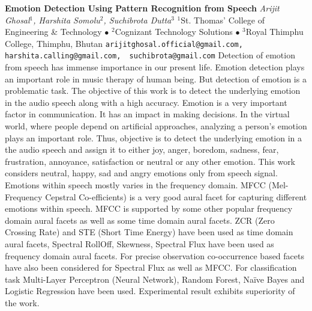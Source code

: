 
    \begin{conf-abstract}[]
        {\textbf{Emotion Detection Using Pattern Recognition from Speech}}
        {\textit{Arijit Ghosal$^{1}$, Harshita  Somolu$^{2}$, Suchibrota  Dutta$^{3}$}}
        {$^{1}$St. Thomas' College of Engineering \& Technology $\bullet$ $^{2}$Cognizant Technology Solutions $\bullet$ $^{3}$Royal Thimphu College, Thimphu, Bhutan}
        {\texttt{arijitghosal.official@gmail.com, harshita.calling@gmail.com,  suchibrota@gmail.com}}
        {Detection of emotion from speech has immense importance in our present life. Emotion detection plays an important role in music therapy of human being. But detection of emotion is a problematic task. The objective of this work is to detect the underlying emotion in the audio speech along with a high accuracy. Emotion is a very important factor in communication. It has an impact in making decisions. In the virtual world, where people depend on artificial approaches, analyzing a person's emotion plays an important role. Thus, objective is to detect the underlying emotion in a the audio speech and assign it to either joy, anger, boredom, sadness, fear, frustration, annoyance, satisfaction or neutral or any other emotion. This work considers neutral, happy, sad and angry emotions only from speech signal. Emotions within speech mostly varies in the frequency domain. MFCC (Mel-Frequency Cepstral Co-efficients) is a very good aural facet for capturing different emotions within speech. MFCC is supported by some other popular frequency domain aural facets as well as some time domain aural facets. ZCR (Zero Crossing Rate) and STE (Short Time Energy) have been used as time domain aural facets, Spectral RollOff, Skewness, Spectral Flux have been used as frequency domain aural facets. For precise observation co-occurrence based facets have also been considered for Spectral Flux as well as MFCC. For classification task Multi-Layer Perceptron (Neural Network), Random Forest, Naïve Bayes and Logistic Regression have been used. Experimental result exhibits superiority of the work.}
    \end{conf-abstract}
        